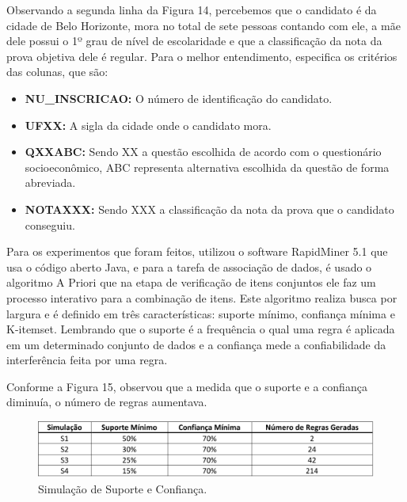 \par
Observando a segunda linha da Figura 14, percebemos que o candidato é da cidade de Belo Horizonte, mora no total de sete pessoas contando com ele, a mãe dele possui o 1º grau de nível de escolaridade e que a classificação da nota da prova objetiva dele é regular. Para o melhor entendimento,  especifica os critérios das colunas, que são:

\begin{itemize}
    \item \textbf{NU\_INSCRICAO:} O número de identificação do candidato. 
    \item \textbf{UFXX:} A sigla da cidade onde o candidato mora.
    \item \textbf{QXXABC:} Sendo XX a questão escolhida de acordo com o questionário socioeconômico, ABC representa alternativa escolhida da questão de forma abreviada.
    \item \textbf{NOTAXXX:} Sendo XXX a classificação da nota da prova que o candidato conseguiu. 
\end{itemize}

\par
Para os experimentos que foram feitos,  utilizou o software RapidMiner 5.1 que usa o código aberto Java, e para a tarefa de associação de dados, é usado o algoritmo A Priori que na etapa de verificação de itens conjuntos ele faz um processo interativo para a combinação de itens. Este algoritmo realiza busca por largura e é definido em três características: suporte mínimo, confiança mínima e K-itemset. Lembrando que o suporte é a frequência o qual uma regra é aplicada em um determinado conjunto de dados e a confiança mede a confiabilidade da interferência feita por uma regra. 

\par
Conforme a Figura 15,  observou que a medida que o suporte e a confiança diminuía, o número de regras aumentava.   

\begin{figure}[!htp]
	\begin{center}
    \caption{\label{fig:waveform_fig} Simulação de Suporte e Confiança.}
	\includegraphics[scale=0.49]{Figuras/Simulacao_suporte_confianca.png}
	\end{center}
\end{figure}

